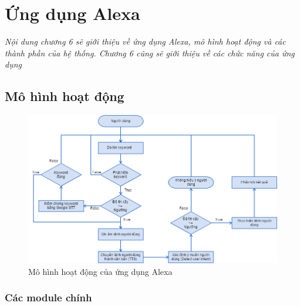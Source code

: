 \chapter{Ứng dụng Alexa}
\ifpdf
    \graphicspath{{Chapter6/Chapter6Figs/PNG/}{Chapter6/Chapter6Figs/PDF/}{Chapter6/Chapter6Figs/}}
\else
    \graphicspath{{Chapter6/Chapter6Figs/EPS/}{Chapter6/Chapter6Figs/}}
\fi

\textit{Nội dung chương 6 sẽ giới thiệu về ứng dụng Alexa, mô hình hoạt động và các thành phần của hệ thống. Chương 6 cũng sẽ giới thiệu về các chức năng của ứng dụng}


\section{Mô hình hoạt động}
\begin{figure}[H]
    \centering
    \includegraphics[scale=0.5]{system_flowchart}
    \caption{Mô hình hoạt động của ứng dụng Alexa}
    \label{fig:c6_system_flowchart}
\end{figure}

\subsection{Các module chính}
